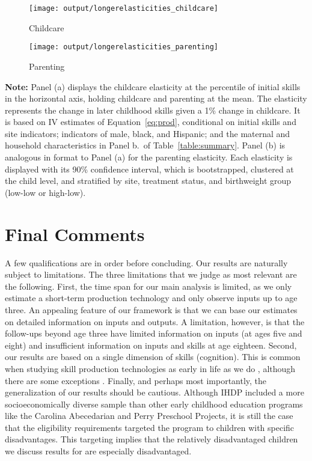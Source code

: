 \begin{sidewaysfigure}
\centering
\caption{Longer-Term Estimates: Elasticities Across the Distribution of Initial Skills} \label{figure:longerestimates}
\begin{subfigure}[h]{0.5\textwidth}
	\centering
	\caption{Childcare}  
	\texttt{[image: output/longerelasticities\_childcare]}
\end{subfigure}%
\begin{subfigure}[h]{0.5\textwidth}
	\centering
	\caption{Parenting} 
	\texttt{[image: output/longerelasticities\_parenting]}
\end{subfigure}
\footnotesize
\justify
\textbf{Note:} Panel (a) displays the childcare elasticity at the percentile of initial skills in the horizontal axis, holding childcare and parenting at the mean. The elasticity represents the change in later childhood skills given a 1\% change in childcare. It is based on IV estimates of Equation~\eqref{eq:prod}, conditional on initial skills and site indicators; indicators of male, black, and Hispanic; and the maternal and household characteristics in Panel b.\ of Table~\ref{table:summary}. Panel (b)  is analogous in format to Panel (a) for the parenting elasticity. Each elasticity is displayed with its 90\% confidence interval, which is bootstrapped, clustered at the child level, and stratified by site, treatment status, and birthweight group (low-low or high-low).
\end{sidewaysfigure}

\section{ Final Comments} \label{section:finalcomments}

\noindent A few qualifications are in order before concluding. Our results are naturally subject to limitations. The three limitations that we judge as most relevant are the following. First, the time span for our main analysis is limited, as we only estimate a short-term production technology and only observe inputs up to age three. An appealing feature of our framework is that we can base our estimates on detailed information on inputs and outputs. A limitation, however, is that the follow-ups beyond age three have limited information on inputs (at ages five and eight) and insufficient information on inputs and skills at age eighteen. Second, our results are based on a single dimension of skills (cognition). This is common when studying skill production technologies as early in life as we do \citep[e.g.,][]{heckmanNonparametricTestsDynamic2023}, although there are some exceptions \citep[e.g.,][]{attanasioEstimatingProductionFunction2020b}. Finally, and perhaps most importantly, the generalization of our results should be cautious. Although IHDP included a more socioeconomically diverse sample than other early childhood education programs like the Carolina Abecedarian and Perry Preschool Projects, it is still the case that the eligibility requirements targeted the program to children with specific disadvantages. This targeting implies that the relatively disadvantaged children we discuss results for are especially disadvantaged.

